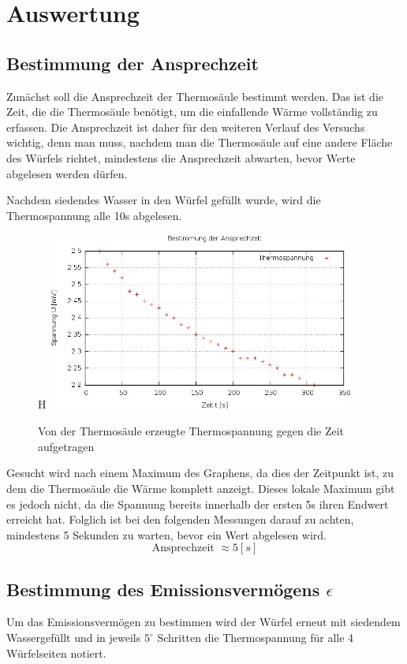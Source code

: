 \section{Auswertung}
\subsection{Bestimmung der Ansprechzeit}
Zunächst soll die Ansprechzeit der Thermosäule bestimmt werden. Das ist die Zeit, die die Thermosäule benötigt, um die einfallende Wärme vollständig zu erfassen. Die Ansprechzeit ist daher für den weiteren Verlauf des Versuchs wichtig, denn man muss, nachdem man die Thermosäule auf eine andere Fläche des Würfels richtet, mindestens die Ansprechzeit abwarten, bevor Werte abgelesen werden dürfen.

Nachdem siedendes Wasser in den Würfel gefüllt wurde, wird die Thermospannung alle 10s abgelesen.

\begin{figure}{H}
\includegraphics[width=0.9\textwidth]{pics/ansprechz.jpg}
\caption{Von der Thermosäule erzeugte Thermospannung gegen die Zeit aufgetragen}
\end{figure}

Gesucht wird nach einem Maximum des Graphens, da dies der Zeitpunkt ist, zu dem die Thermosäule die Wärme komplett anzeigt. Dieses lokale Maximum gibt es jedoch nicht, da die Spannung bereits innerhalb der ersten 5s ihren Endwert erreicht hat. Folglich ist bei den folgenden Messungen darauf zu achten, mindestens 5 Sekunden zu warten, bevor ein Wert abgelesen wird.
\begin{equation}
\text{Ansprechzeit }\approx 5[s]
\end{equation}

\subsection{Bestimmung des Emissionsvermögens $\epsilon$}
Um das Emissionsvermögen zu bestimmen wird der Würfel erneut mit siedendem Wassergefüllt und in jeweils $5^\circ$ Schritten die Thermospannung für alle 4 Würfelseiten notiert.


